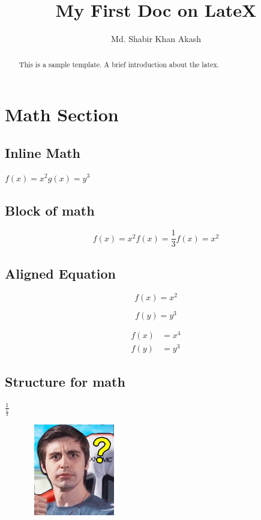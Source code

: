 \documentclass{report}
\title{My First Doc on LateX}
\author{Md. Shabir Khan Akash}
\begin{document}
		\maketitle


	\begin{abstract}
		This is a sample template. 
		A brief introduction about the latex.
	\end{abstract}

	\section{Math Section}
	\subsection{Inline Math}
	$ f(x)=x^2 
	  g(x)=y^3 
	$
	
	\subsection{Block of math}
	\[	f(x)=x^2
		f(x)=\frac{1}{3}
		f(x)=x^2	
	\]
	\subsection{Aligned Equation}
	\begin{equation}
		f(x)=x^2
	\end{equation}
	
	\begin{equation}
		f(y)=y^3
	\end{equation}
	
	\begin{align}
		f(x) &= x^4\\
		f(y)&=y^3
	\end{align}
	
	\subsection{Structure for math}
	
	$\frac{1}{\frac{1}{3}}$
	
	\begin{figure}[h!]
		\includegraphics[width=4cm,height=4cm]{shroud.jpg}
		\label{fig:shroud}
	\end{figure}		


	
\end{document}
